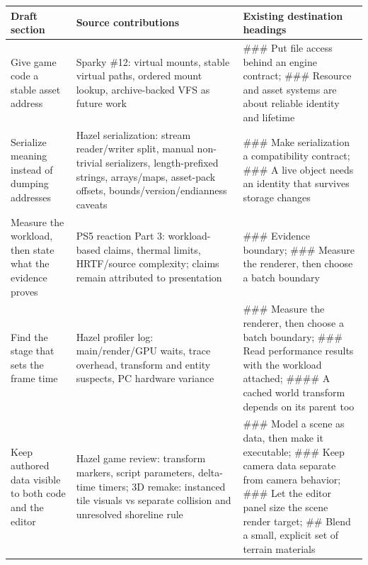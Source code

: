 {\def\LTcaptype{none} %
\begin{longtable}[]{@{}
  >{\raggedright\arraybackslash}p{}
  >{\raggedright\arraybackslash}p{}
  >{\raggedright\arraybackslash}p{}@{}}
\toprule\noalign{}
\begin{minipage}[b]{\linewidth}\raggedright
Draft section
\end{minipage} & \begin{minipage}[b]{\linewidth}\raggedright
Source contributions
\end{minipage} & \begin{minipage}[b]{\linewidth}\raggedright
Existing destination headings
\end{minipage} \\
\midrule\noalign{}
\endhead
\bottomrule\noalign{}
\endlastfoot
Give game code a stable asset address & Sparky \#12: virtual mounts, stable virtual paths, ordered mount lookup, archive-backed VFS as future work & \#\#\# Put file access behind an engine contract; \#\#\# Resource and asset systems are about reliable identity and lifetime \\
Serialize meaning instead of dumping addresses & Hazel serialization: stream reader/writer split, manual non-trivial serializers, length-prefixed strings, arrays/maps, asset-pack offsets, bounds/version/endianness caveats & \#\#\# Make serialization a compatibility contract; \#\#\# A live object needs an identity that survives storage changes \\
Measure the workload, then state what the evidence proves & PS5 reaction Part 3: workload-based claims, thermal limits, HRTF/source complexity; claims remain attributed to presentation & \#\#\# Evidence boundary; \#\#\# Measure the renderer, then choose a batch boundary \\
Find the stage that sets the frame time & Hazel profiler log: main/render/GPU waits, trace overhead, transform and entity suspects, PC hardware variance & \#\#\# Measure the renderer, then choose a batch boundary; \#\#\# Read performance results with the workload attached; \#\#\#\# A cached world transform depends on its parent too \\
Keep authored data visible to both code and the editor & Hazel game review: transform markers, script parameters, delta-time timers; 3D remake: instanced tile visuals vs separate collision and unresolved shoreline rule & \#\#\# Model a scene as data, then make it executable; \#\#\# Keep camera data separate from camera behavior; \#\#\# Let the editor panel size the scene render target; \#\# Blend a small, explicit set of terrain materials \\

\end{longtable}}
